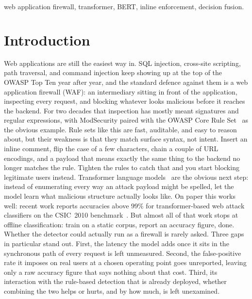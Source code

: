 \documentclass[conference]{IEEEtran}
\begin{document}
\begin{IEEEkeywords}
web application firewall, transformer, BERT, inline enforcement, decision fusion.
\end{IEEEkeywords}

\section{Introduction}
Web applications are still the easiest way in. SQL injection, cross-site
scripting, path traversal, and command injection keep showing up at the top
of the OWASP Top Ten year after year, and the standard defence against them
is a web application firewall (WAF): an intermediary sitting in front of the
application, inspecting every request, and blocking whatever looks
malicious before it reaches the backend. For two decades that inspection has
mostly meant signatures and regular expressions, with ModSecurity paired
with the OWASP Core Rule Set~\cite{owaspcrs} as the obvious example. Rule sets
like this are fast, auditable, and easy to reason about, but their weakness
is that they match surface syntax, not intent. Insert an inline comment,
flip the case of a few characters, chain a couple of URL encodings, and a
payload that means exactly the same thing to the backend no longer matches
the rule. Tighten the rules to catch that and you start blocking legitimate
users instead.
Transformer language models~\cite{vaswani2017attention,devlin2019bert} are
the obvious next step: instead of enumerating every way an attack payload
might be spelled, let the model learn what malicious structure actually
looks like. On paper this works well: recent work reports accuracies above
$99\%$ for transformer-based web attack classifiers on the CSIC~2010
benchmark~\cite{wadbert2026,liu2024bertlstm}. But almost all of that work
stops at offline classification: train on a static corpus, report an
accuracy figure, done. Whether the detector could actually run as a
firewall is rarely asked. Three gaps in particular stand out. First, the
latency the model adds once it sits in the synchronous path of every
request is left unmeasured. Second, the false-positive rate it imposes on
real users at a chosen operating point goes unreported, leaving only a raw
accuracy figure that says nothing about that cost. Third, its interaction
with the rule-based detection that is already deployed, whether combining
the two helps or hurts, and by how much, is left unexamined.
\end{document}

